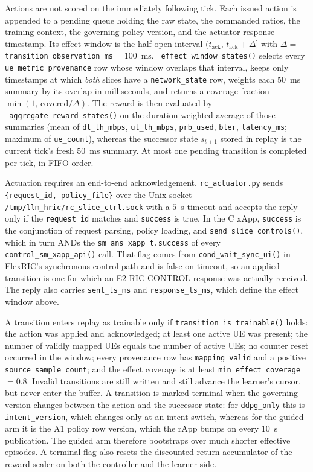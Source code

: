 Actions are not scored on the immediately following tick. Each issued action is appended to a pending queue holding the raw state, the commanded ratios, the training context, the governing policy version, and the actuator response timestamp. Its effect window is the half-open interval $(t_{\mathrm{ack}},\,t_{\mathrm{ack}}+\Delta]$ with $\Delta={}$\texttt{transition\_observation\_ms}${}=100$~ms. \texttt{\_effect\_window\_states()} selects every \texttt{ue\_metric\_provenance} row whose window overlaps that interval, keeps only timestamps at which \emph{both} slices have a \texttt{network\_state} row, weights each $50$~ms summary by its overlap in milliseconds, and returns a coverage fraction $\min(1,\,\text{covered}/\Delta)$. The reward is then evaluated by \texttt{\_aggregate\_reward\_states()} on the duration-weighted average of those summaries (mean of \texttt{dl\_th\_mbps}, \texttt{ul\_th\_mbps}, \texttt{prb\_used}, \texttt{bler}, \texttt{latency\_ms}; maximum of \texttt{ue\_count}), whereas the successor state $s_{t+1}$ stored in replay is the current tick's fresh $50$~ms summary. At most one pending transition is completed per tick, in FIFO order.

Actuation requires an end-to-end acknowledgement. \texttt{rc\_actuator.py} sends \texttt{\{request\_id, policy\_file\}} over the Unix socket \texttt{/tmp/llm\_hric/rc\_slice\_ctrl.sock} with a $5$~s timeout and accepts the reply only if the \texttt{request\_id} matches and \texttt{success} is true. In the C xApp, \texttt{success} is the conjunction of request parsing, policy loading, and \texttt{send\_slice\_controls()}, which in turn ANDs the \texttt{sm\_ans\_xapp\_t.success} of every \texttt{control\_sm\_xapp\_api()} call. That flag comes from \texttt{cond\_wait\_sync\_ui()} in FlexRIC's synchronous control path and is false on timeout, so an applied transition is one for which an E2 RIC CONTROL response was actually received. The reply also carries \texttt{sent\_ts\_ms} and \texttt{response\_ts\_ms}, which define the effect window above.

A transition enters replay as trainable only if \texttt{transition\_is\_trainable()} holds: the action was applied and acknowledged; at least one active UE was present; the number of validly mapped UEs equals the number of active UEs; no counter reset occurred in the window; every provenance row has \texttt{mapping\_valid} and a positive \texttt{source\_sample\_count}; and the effect coverage is at least \texttt{min\_effect\_coverage}${}=0.8$. Invalid transitions are still written and still advance the learner's cursor, but never enter the buffer. A transition is marked terminal when the governing version changes between the action and the successor state: for \texttt{ddpg\_only} this is \texttt{intent\_version}, which changes only at an intent switch, whereas for the guided arm it is the A1 policy row version, which the rApp bumps on every $10$~s publication. The guided arm therefore bootstraps over much shorter effective episodes. A terminal flag also resets the discounted-return accumulator of the reward scaler on both the controller and the learner side.

